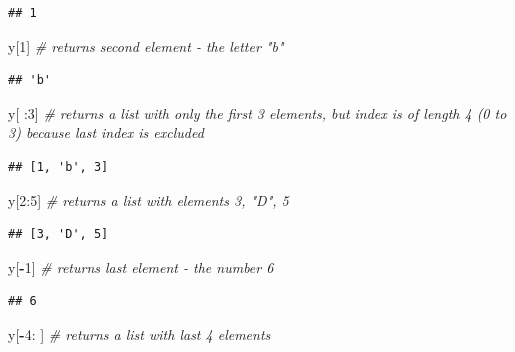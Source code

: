 \documentclass[]{book}
\newenvironment{Shaded}{\begin{snugshade}}{\end{snugshade}}
\newcommand{\CommentTok}[1]{\textcolor[rgb]{0.56,0.35,0.01}{\textit{#1}}}
\newcommand{\DecValTok}[1]{\textcolor[rgb]{0.00,0.00,0.81}{#1}}
\newcommand{\NormalTok}[1]{#1}
\newcommand{\OperatorTok}[1]{\textcolor[rgb]{0.81,0.36,0.00}{\textbf{#1}}}
\begin{document}
\begin{verbatim}
## 1
\end{verbatim}

\begin{Shaded}
\begin{Highlighting}[]
\NormalTok{y[}\DecValTok{1}\NormalTok{] }\CommentTok{# returns second element - the letter "b"}
\end{Highlighting}
\end{Shaded}

\begin{verbatim}
## 'b'
\end{verbatim}

\begin{Shaded}
\begin{Highlighting}[]
\NormalTok{y[ :}\DecValTok{3}\NormalTok{] }\CommentTok{# returns a list with only the first 3 elements, but index is of length 4 (0 to 3) because last index is excluded}
\end{Highlighting}
\end{Shaded}

\begin{verbatim}
## [1, 'b', 3]
\end{verbatim}

\begin{Shaded}
\begin{Highlighting}[]
\NormalTok{y[}\DecValTok{2}\NormalTok{:}\DecValTok{5}\NormalTok{] }\CommentTok{# returns a list with elements 3, "D", 5}
\end{Highlighting}
\end{Shaded}

\begin{verbatim}
## [3, 'D', 5]
\end{verbatim}

\begin{Shaded}
\begin{Highlighting}[]
\NormalTok{y[}\OperatorTok{-}\DecValTok{1}\NormalTok{] }\CommentTok{# returns last element - the number 6 }
\end{Highlighting}
\end{Shaded}

\begin{verbatim}
## 6
\end{verbatim}

\begin{Shaded}
\begin{Highlighting}[]
\NormalTok{y[}\OperatorTok{-}\DecValTok{4}\NormalTok{: ] }\CommentTok{# returns a list with last 4 elements}
\end{Highlighting}
\end{Shaded}
\end{document}
